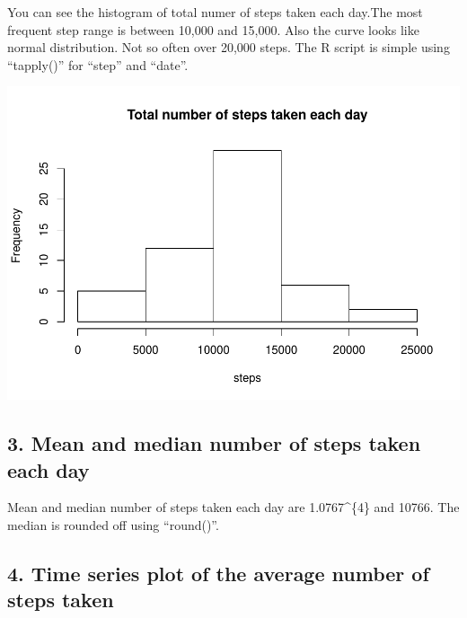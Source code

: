 \documentclass[]{article}
\newenvironment{Shaded}{\begin{snugshade}}{\end{snugshade}}
\newcommand{\KeywordTok}[1]{\textcolor[rgb]{0.13,0.29,0.53}{\textbf{#1}}}
\newcommand{\DataTypeTok}[1]{\textcolor[rgb]{0.13,0.29,0.53}{#1}}
\newcommand{\StringTok}[1]{\textcolor[rgb]{0.31,0.60,0.02}{#1}}
\newcommand{\OtherTok}[1]{\textcolor[rgb]{0.56,0.35,0.01}{#1}}
\newcommand{\OperatorTok}[1]{\textcolor[rgb]{0.81,0.36,0.00}{\textbf{#1}}}
\newcommand{\NormalTok}[1]{#1}
\begin{document}
You can see the histogram of total numer of steps taken each day.The
most frequent step range is between 10,000 and 15,000. Also the curve
looks like normal distribution. Not so often over 20,000 steps. The R
script is simple using ``tapply()'' for ``step'' and ``date''.

\begin{Shaded}
\end{Shaded}

\includegraphics{PA1_template_files/figure-latex/total-1.pdf}

\subsection{3. Mean and median number of steps taken each
day}\label{mean-and-median-number-of-steps-taken-each-day}

Mean and median number of steps taken each day are
1.0767\^{}\{4\} and 10766. The median is rounded off using
``round()''.

\subsection{4. Time series plot of the average number of steps
taken}\label{time-series-plot-of-the-average-number-of-steps-taken}
\end{document}
